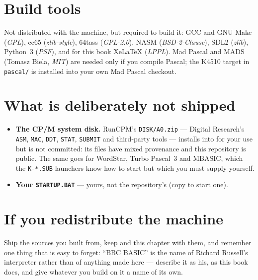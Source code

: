 \section{Build tools}
Not distributed with the machine, but required to build it: GCC and
GNU Make (\emph{GPL}), cc65 (\emph{zlib-style}), 64tass
(\emph{GPL-2.0}), NASM (\emph{BSD-2-Clause}), SDL2 (\emph{zlib}),
Python~3 (\emph{PSF}), and for this book XeLaTeX (\emph{LPPL}). Mad
Pascal and MADS (Tomasz Biela, \emph{MIT}) are needed only if you
compile Pascal; the K4510 target in \verb|pascal/| is installed into
your own Mad Pascal checkout.

\section{What is deliberately not shipped}
\begin{itemize}[leftmargin=1.4em]
\item \textbf{The CP/M system disk.} RunCPM's \verb|DISK/A0.zip| ---
  Digital Research's \verb|ASM|, \verb|MAC|, \verb|DDT|, \verb|STAT|,
  \verb|SUBMIT| and third-party tools --- installs into
   for your use but is not committed: its files have
  mixed provenance and this repository is public. The same goes for
  WordStar, Turbo Pascal~3 and MBASIC, which the \verb|K-*.SUB|
  launchers know how to start but which you must supply yourself.
\item \textbf{Your \texttt{STARTUP.BAT}} --- yours, not the repository's
  (copy  to start one).
\end{itemize}

\section{If you redistribute the machine}
Ship the sources you built from, keep  and this
chapter with them, and remember one thing that is easy to forget: ``BBC BASIC'' is the name of Richard Russell's
interpreter rather than of anything made here --- describe it as his,
as this book does, and give whatever you build on it a name of its own.
